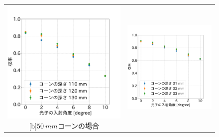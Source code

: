 \begin{figure}[htbp]
  \begin{tabular}{cc}
    \begin{minipage}[t]{0.45\hsize}
      \centering
      \includegraphics[keepaspectratio, scale=0.3]{images/chapter3/cone50_optimize2.pdf}
      [b]$\SI{50}{mm}$コーンの場合
      \label{fig:cone50_optimize2}
    \end{minipage} &
    \begin{minipage}[t]{0.45\hsize}
      \centering
      \includegraphics[keepaspectratio, scale=0.3]{images/chapter3/cone30_optimize2.pdf}

\end{minipage}
\end{tabular}
\end{figure}
